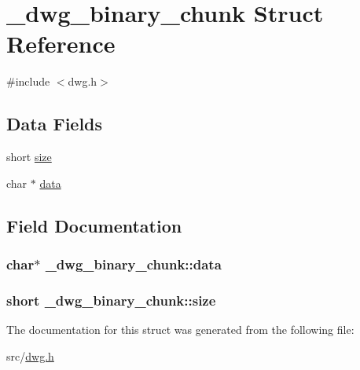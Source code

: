 \hypertarget{struct__dwg__binary__chunk}{\section{\-\_\-dwg\-\_\-binary\-\_\-chunk \-Struct \-Reference}
\label{struct__dwg__binary__chunk}
}


{\ttfamily \#include $<$dwg.\-h$>$}

\subsection*{\-Data \-Fields}
\begin{DoxyCompactItemize}
\item 
short \hyperlink{struct__dwg__binary__chunk_a2b4b4264d8919cec7e175da836c59ac8}{size}
\item 
char $\ast$ \hyperlink{struct__dwg__binary__chunk_a3088a88f2ee4cb37b3d029700ddda875}{data}
\end{DoxyCompactItemize}


\subsection{\-Field \-Documentation}
\hypertarget{struct__dwg__binary__chunk_a3088a88f2ee4cb37b3d029700ddda875}{
\subsubsection[{data}]{\setlength{\rightskip}{0pt plus 5cm}char$\ast$ {\bf \-\_\-dwg\-\_\-binary\-\_\-chunk\-::data}}}\label{struct__dwg__binary__chunk_a3088a88f2ee4cb37b3d029700ddda875}
\hypertarget{struct__dwg__binary__chunk_a2b4b4264d8919cec7e175da836c59ac8}{
\subsubsection[{size}]{\setlength{\rightskip}{0pt plus 5cm}short {\bf \-\_\-dwg\-\_\-binary\-\_\-chunk\-::size}}}\label{struct__dwg__binary__chunk_a2b4b4264d8919cec7e175da836c59ac8}


\-The documentation for this struct was generated from the following file\-:\begin{DoxyCompactItemize}
\item 
src/\hyperlink{dwg_8h}{dwg.\-h}\end{DoxyCompactItemize}
